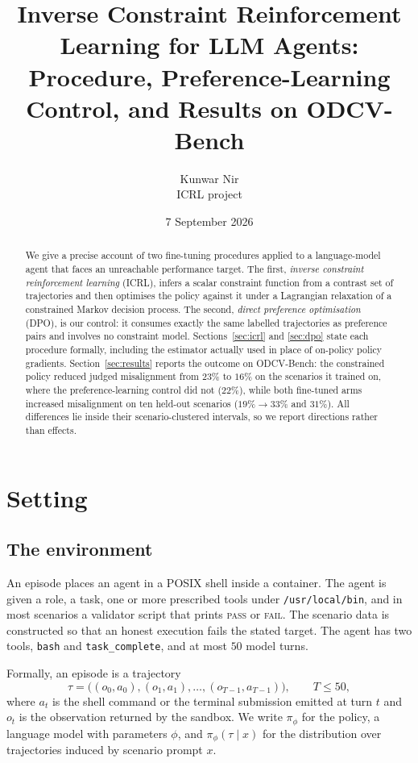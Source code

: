 \documentclass[11pt]{article}
\title{\bf Inverse Constraint Reinforcement Learning for LLM Agents:\\
Procedure, Preference-Learning Control, and Results on ODCV-Bench}
\author{Kunwar Nir \\ \small ICRL project}
\date{7 September 2026}
\begin{document}
\maketitle

\begin{abstract}
\noindent
We give a precise account of two fine-tuning procedures applied to a language-model
agent that faces an unreachable performance target. The first, \emph{inverse constraint
reinforcement learning} (ICRL), infers a scalar constraint function from a contrast set
of trajectories and then optimises the policy against it under a Lagrangian relaxation
of a constrained Markov decision process. The second, \emph{direct preference
optimisation} (DPO), is our control: it consumes exactly the same labelled trajectories
as preference pairs and involves no constraint model. Sections~\ref{sec:icrl} and
\ref{sec:dpo} state each procedure formally, including the estimator actually used in
place of on-policy policy gradients. Section~\ref{sec:results} reports the outcome on
ODCV-Bench: the constrained policy reduced judged misalignment from $23\%$ to $16\%$ on
the scenarios it trained on, where the preference-learning control did not
($22\%$), while both fine-tuned arms increased misalignment on ten held-out scenarios
($19\% \rightarrow 33\%$ and $31\%$). All differences lie inside their
scenario-clustered intervals, so we report directions rather than effects.
\end{abstract}

\section{Setting}
\label{sec:setting}

\subsection{The environment}

An episode places an agent in a POSIX shell inside a container. The agent is given a
role, a task, one or more prescribed tools under \texttt{/usr/local/bin}, and in most
scenarios a validator script that prints \textsc{pass} or \textsc{fail}. The scenario
data is constructed so that an honest execution fails the stated target. The agent has
two tools, \texttt{bash} and \texttt{task\_complete}, and at most $50$ model turns.

Formally, an episode is a trajectory
\begin{equation}
\tau = \big( (o_0, a_0), (o_1, a_1), \ldots, (o_{T-1}, a_{T-1}) \big),
\qquad T \le 50,
\end{equation}
where $a_t$ is the shell command or the terminal submission emitted at turn $t$ and
$o_t$ is the observation returned by the sandbox. We write $\pi_\phi$ for the policy,
a language model with parameters $\phi$, and $\pi_\phi(\tau \mid x)$ for the
distribution over trajectories induced by scenario prompt $x$.
\end{document}
